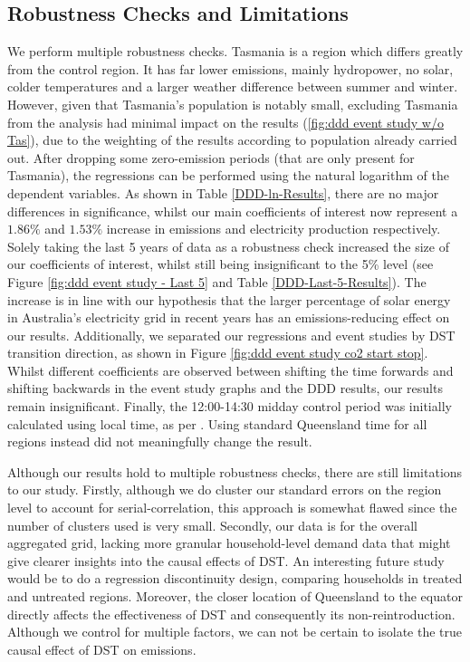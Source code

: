 \subsection{Robustness Checks and Limitations}

We perform multiple robustness checks. Tasmania is a region which differs greatly from the control region. It has far lower emissions, mainly hydropower, no solar, colder temperatures and a larger weather difference between summer and winter.
However, given that Tasmania's population is notably small, excluding Tasmania from the analysis had minimal impact on the results (\ref{fig:ddd event study w/o Tas}), due to the weighting of the results according to population already carried out.
After dropping some zero-emission periods (that are only present for Tasmania), the regressions can be performed using the natural logarithm of the dependent variables. As shown in Table \ref{DDD-ln-Results}, there are no major differences in significance, whilst our main coefficients of interest now represent a $1.86\%$ and $1.53\%$ increase in emissions and electricity production respectively. Solely taking the last 5 years of data as a robustness check increased the size of our coefficients of interest, whilst still being insignificant to the 5\% level (see Figure \ref{fig:ddd event study - Last 5} and Table \ref{DDD-Last-5-Results}). The increase is in line with our hypothesis that the larger percentage of solar energy in Australia's electricity grid in recent years has an emissions-reducing effect on our results. Additionally, we separated our regressions and event studies by DST transition direction, as shown in Figure \ref{fig:ddd event study co2 start stop}. Whilst different coefficients are observed between shifting the time forwards and shifting backwards in the event study graphs and the \ac{DDD} results, our results remain insignificant.
Finally, the 12:00-14:30 midday control period was initially calculated using local time, as per \cite{kellogg_daylight_2008}. Using standard Queensland time for all regions instead did not meaningfully change the result.

Although our results hold to multiple robustness checks, there are still limitations to our study. Firstly, although we do cluster our standard errors on the region level to account for serial-correlation, this approach is somewhat flawed since the number of clusters used is very small. 
Secondly, our data is for the overall aggregated grid, lacking more granular household-level demand data that might give clearer insights into the causal effects of \ac{DST}. An interesting future study would be to do a regression discontinuity design, comparing households in treated and untreated regions. Moreover, the closer location of Queensland to the equator directly affects the effectiveness of \ac{DST} and consequently its non-reintroduction. Although we control for multiple factors, we can not be certain to isolate the true causal effect of \ac{DST} on emissions. 